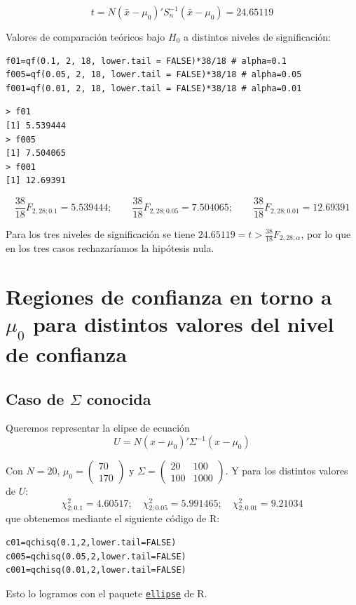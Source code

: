 \documentclass[12pt]{article}
\begin{document}
\[t=N(\bar{x}-\mu_0)'S_n^{-1}(\bar{x}-\mu_0)=24.65119\]

Valores de comparación teóricos bajo $H_0$ a distintos niveles de significación:

\begin{verbatim}
f01=qf(0.1, 2, 18, lower.tail = FALSE)*38/18 # alpha=0.1
f005=qf(0.05, 2, 18, lower.tail = FALSE)*38/18 # alpha=0.05
f001=qf(0.01, 2, 18, lower.tail = FALSE)*38/18 # alpha=0.01
\end{verbatim}

\begin{verbatim}
> f01
[1] 5.539444
> f005
[1] 7.504065
> f001
[1] 12.69391
\end{verbatim}

\[\frac{38}{18}F_{2,28;0.1}=5.539444 ; \qquad \frac{38}{18}F_{2,28;0.05}=7.504065 ; \qquad \frac{38}{18}F_{2,28;0.01}=12.69391\]

Para los tres niveles de significación se tiene
$24.65119=t>\frac{38}{18}F_{2,28;\alpha}$, por lo que en los tres casos
rechazaríamos la hipótesis nula.

\section{Regiones de confianza en torno a $\mu_0$ para distintos
  valores del nivel de confianza}

\subsection{Caso de $\Sigma$ conocida}

Queremos representar la elipse de ecuación
\[U=N(x-\mu_0)'\Sigma^{-1}(x-\mu_0)\]

Con $N=20$, $\mu_0=
\begin{pmatrix}
  70 \\ 170
\end{pmatrix}$ y $\Sigma=
\begin{pmatrix}
  20 & 100 \\ 100 & 1000
\end{pmatrix}
$. Y para los distintos valores de $U$:
\[\chi^2_{2;0.1}=4.60517;\quad \chi^2_{2;0.05}=5.991465;\quad \chi^2_{2;0.01}=9.21034\]
que obtenemos mediante el siguiente código de R:
\begin{verbatim}
c01=qchisq(0.1,2,lower.tail=FALSE)
c005=qchisq(0.05,2,lower.tail=FALSE)
c001=qchisq(0.01,2,lower.tail=FALSE)
\end{verbatim}

Esto lo logramos con el paquete \href{https://cran.r-project.org/web/packages/ellipse/ellipse.pdf}{\texttt{ellipse}} de R.
\end{document}

